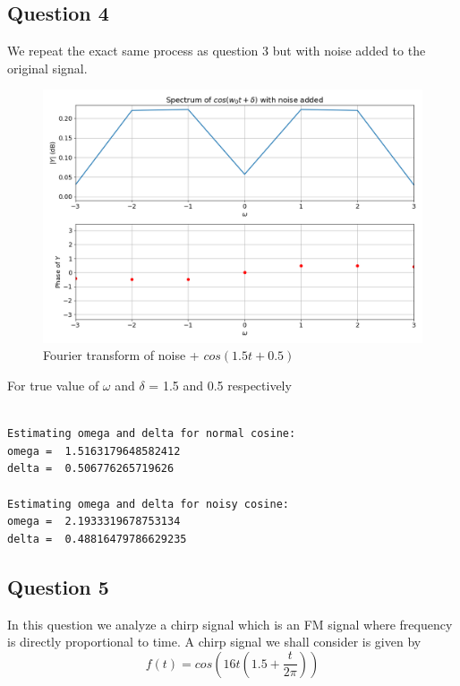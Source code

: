\documentclass[11pt, a4paper]{article}
\begin{document}
\subsection{Question 4}

We repeat the exact same process as question 3 but with noise added to the original signal.

\begin{figure}[!tbh]
\centering
\includegraphics[scale=0.4]{plots/noisy_cosine.png}
\caption{Fourier transform of noise + $cos(1.5t+0.5)$}
\label{fig:11}
\end{figure}

\noindent
For true value of $\omega$ and $\delta$ = 1.5 and 0.5 respectively 

\begin{verbatim}

Estimating omega and delta for normal cosine: 
omega =  1.5163179648582412
delta =  0.506776265719626

Estimating omega and delta for noisy cosine: 
omega =  2.1933319678753134
delta =  0.48816479786629235

\end{verbatim}
    
\subsection{Question 5}
In this question we analyze a chirp signal which is an FM signal where frequency is directly proportional to time.
A chirp signal we shall consider is given by 
\begin{equation}
    f(t) = cos(16t(1.5 + \frac{t}{2\pi}))
\end{equation}
\end{document}
